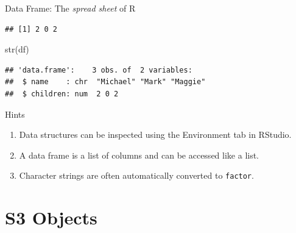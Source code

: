 \documentclass[
  9pt,
  ignorenonframetext,
]{beamer}
\newenvironment{Shaded}{\begin{snugshade}}{\end{snugshade}}
\newcommand{\KeywordTok}[1]{\textcolor[rgb]{0.94,0.87,0.69}{#1}}
\newcommand{\NormalTok}[1]{\textcolor[rgb]{0.80,0.80,0.80}{#1}}
\providecommand{\tightlist}{%
  \setlength{\itemsep}{0pt}\setlength{\parskip}{0pt}}
\begin{document}
\begin{frame}[fragile]{Data Frame: The \emph{spread sheet} of R}
\begin{verbatim}
## [1] 2 0 2
\end{verbatim}

\begin{Shaded}
\begin{Highlighting}[]
\KeywordTok{str}\NormalTok{(df)}
\end{Highlighting}
\end{Shaded}

\begin{verbatim}
## 'data.frame':    3 obs. of  2 variables:
##  $ name    : chr  "Michael" "Mark" "Maggie"
##  $ children: num  2 0 2
\end{verbatim}

\small
\vfill

\begin{block}{Hints}
\protect\hypertarget{hints}{}
\begin{enumerate}
\tightlist
\item
  Data structures can be inspected using the Environment tab in RStudio.
\item
  A data frame is a list of columns and can be accessed like a list.
\item
  Character strings are often automatically converted to
  \texttt{factor}.
\end{enumerate}
\end{block}
\end{frame}

\hypertarget{s3-objects}{%
\section{S3 Objects}\label{s3-objects}}
\end{document}
